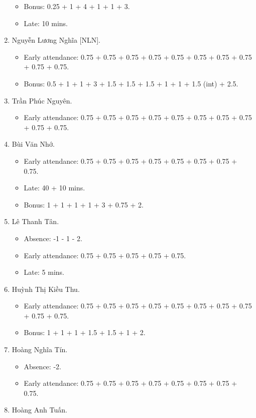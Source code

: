 \documentclass{article}
\begin{document}
\begin{enumerate}
\begin{itemize}
		\item Bonus: 0.25 + 1 + 4 + 1 + 1 + 3.
		\item Late: 10 mins.
	\end{itemize}
	\item {\sc Nguyễn Lương Nghĩa [NLN].}
	\begin{itemize}
		\item Early attendance: 0.75 + 0.75 + 0.75 + 0.75 + 0.75 + 0.75 + 0.75 + 0.75 + 0.75 + 0.75.
		\item Bonus: 0.5 + 1 + 1 + 3 + 1.5 + 1.5 + 1.5 + 1 + 1 + 1.5 (int) + 2.5.
	\end{itemize}
	\item {\sc Trần Phúc Nguyên.}
	\begin{itemize}
		\item Early attendance: 0.75 + 0.75 + 0.75 + 0.75 + 0.75 + 0.75 + 0.75 + 0.75 + 0.75 + 0.75.
	\end{itemize}
	\item {\sc Bùi Văn Nhớ.}
	\begin{itemize}
		\item Early attendance: 0.75 + 0.75 + 0.75 + 0.75 + 0.75 + 0.75 + 0.75 + 0.75.
		\item Late: 40 + 10 mins.
		\item Bonus: 1 + 1 + 1 + 1 + 3 + 0.75 + 2.
	\end{itemize}
	\item {\sc Lê Thanh Tân.}
	\begin{itemize}
		\item Absence: -1 - 1 - 2.
		\item Early attendance: 0.75 + 0.75 + 0.75 + 0.75 + 0.75.
		\item Late: 5 mins.
	\end{itemize}
	\item {\sc Huỳnh Thị Kiều Thu.}
	\begin{itemize}
		\item Early attendance: 0.75 + 0.75 + 0.75 + 0.75 + 0.75 + 0.75 + 0.75 + 0.75 + 0.75 + 0.75.
		\item Bonus: 1 + 1 + 1 + 1.5 + 1.5 + 1 + 2.
	\end{itemize}
	\item {\sc Hoàng Nghĩa Tín.}
	\begin{itemize}
        \item Absence: -2.
		\item Early attendance: 0.75 + 0.75 + 0.75 + 0.75 + 0.75 + 0.75 + 0.75 + 0.75.
	\end{itemize}
	\item {\sc Hoàng Anh Tuấn.}

\end{enumerate}
\end{document}
